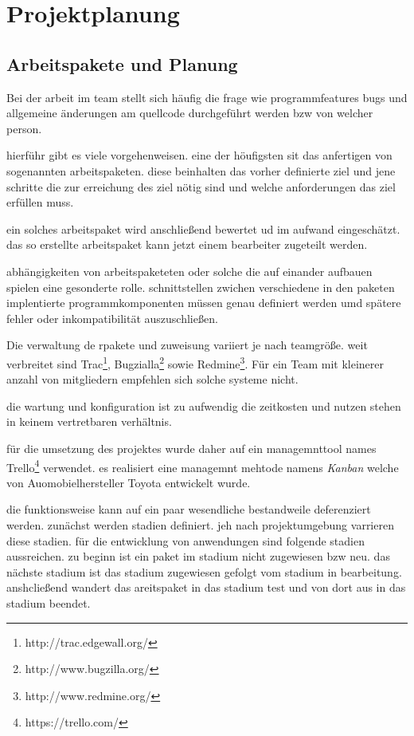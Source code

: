 \section{Projektplanung}
\subsection{Arbeitspakete und Planung}
Bei der arbeit im team stellt sich häufig die frage wie programmfeatures bugs und allgemeine änderungen am quellcode durchgeführt werden bzw von welcher person.

hierführ gibt es viele vorgehenweisen. eine der höufigsten sit das anfertigen von sogenannten arbeitspaketen. diese beinhalten das vorher definierte ziel und jene schritte die zur erreichung des ziel nötig sind und welche anforderungen das ziel erfüllen muss.

ein solches arbeitspaket wird anschließend bewertet ud im aufwand eingeschätzt. das so erstellte arbeitspaket kann jetzt einem bearbeiter zugeteilt werden.

abhängigkeiten von arbeitspaketeten oder solche die auf einander aufbauen spielen eine gesonderte rolle. schnittstellen zwichen verschiedene in den paketen implentierte programmkomponenten müssen genau definiert werden umd spätere fehler oder inkompatibilität auszuschließen.

Die verwaltung de rpakete und zuweisung variiert je nach teamgröße. weit verbreitet sind Trac\footnote{http://trac.edgewall.org/}, Bugzialla\footnote{http://www.bugzilla.org/} sowie Redmine\footnote{http://www.redmine.org/}. Für ein Team mit kleinerer anzahl von mitgliedern empfehlen sich solche systeme nicht.

die wartung und konfiguration ist zu aufwendig die zeitkosten und nutzen stehen in keinem vertretbaren verhältnis.

für die umsetzung des projektes wurde daher auf ein managemnttool names Trello\footnote{https://trello.com/} verwendet. es realisiert eine managemnt mehtode namens \textit{Kanban} welche von Auomobielhersteller Toyota entwickelt wurde.

die funktionsweise kann auf ein paar wesendliche bestandweile deferenziert werden. zunächst werden stadien definiert. jeh nach projektumgebung varrieren diese stadien. für die entwicklung von anwendungen sind folgende stadien aussreichen. zu beginn ist ein paket im stadium nicht zugewiesen bzw neu. das nächste stadium ist das stadium zugewiesen gefolgt vom stadium in bearbeitung. anshcließend wandert das areitspaket in das stadium test und von dort aus in das stadium beendet.


